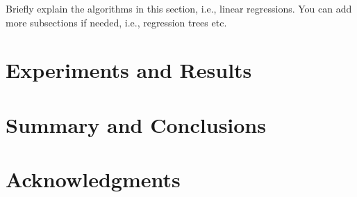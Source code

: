\documentclass[fleqn,10pt]{SelfArx} %
\begin{document}
Briefly explain the algorithms in this section, i.e., linear regressions. You can add more subsections if needed, i.e., regression trees etc.


\bigskip
\bigskip
\section{Experiments and Results}


\bigskip
\bigskip
\section{Summary and Conclusions}
\bigskip
\bigskip
\bigskip



\section*{Acknowledgments} %







\end{document}
